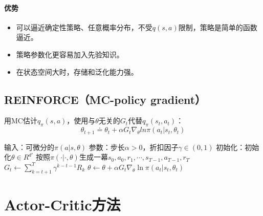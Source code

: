 \documentclass[
12pt, %
a4paper, 
oneside, %
headinclude,footinclude, %
]{scrartcl}
\begin{document}
\paragraph{优势}
\begin{itemize}
\item 可以逼近确定性策略、任意概率分布，不受$ q(s, a) $限制，策略是简单的函数逼近。
\item 策略参数化更容易加入先验知识。
\item 在状态空间大时，存储和泛化能力强。
\end{itemize}
\subsection[REINFORCE]{REINFORCE（MC-policy gradient）}
用MC估计$ q_\pi(s, a) $，使用与$ \theta $无关的$ G_t $代替$ q_\pi(s_t, a_t) $：
$$ \theta_{t + 1} \doteq \theta_t + \alpha G_t \nabla_{\theta} ln \pi (a_t|s_t, \theta_t) $$
\begin{myalgorithm}[REINFORCE]
\State 输入：可微分的$ \pi(a|s, \theta) $
\State 参数：步长$ \alpha > 0 $，折扣因子$ \gamma \in (0, 1) $
\State 初始化：初始化$ \theta \in R^{d'} $
\Loop
\State 按照$ \pi(\cdot|\cdot, \theta) $生成一幕$ s_0, a_0, r_1, \cdots, s_{T - 1}, a_{T - 1}, r_T $
\State $ G_t \gets \sum_{k = t + 1}^{T} \gamma^{k - t - 1}R_k $
\State $ \theta \gets \theta + \alpha G_t \nabla_{\theta} \ln \pi(a_t|s_t, \theta_t) $
\EndFor
\EndLoop
\end{myalgorithm}
\section{Actor-Critic方法}
\end{document}
